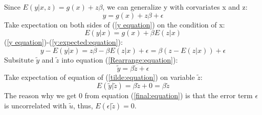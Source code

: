 \documentclass[11pt]{article} %
\begin{document}
Since $E(y|x,z)=g(x)+z\beta$, we can generalize y with corvariates x and z:
\begin{equation}
    y=g(x)+z\beta+\epsilon \label{y equation}
\end{equation}
Take expectation on both sides of (\ref{y equation}) on the condition of x:
\begin{equation} \label{y:expected:equation}
    E(y|x)=g(x)+\beta E(z|x) 
\end{equation}
(\ref{y equation})-(\ref{y:expected:equation}): 
\begin{equation}\label{Rearrange:equation}
    y-E(y|x)=z\beta-\beta E(z|x)+\epsilon=\beta(z-E(z|x))+\epsilon
\end{equation}
Subsitute $\tilde{y}$ and $\tilde{z}$ into equation (\ref{Rearrange:equation}):
\begin{equation}\label{tilde:equation}
    \tilde{y}=\beta \tilde{z}+\epsilon
\end{equation}
Take expectation of equation of (\ref{tilde:equation}) on variable $\tilde{z}$:
\begin{equation}\label{final:equation}
    E(\tilde{y}|\tilde{z})=\beta \tilde{z}+0=\beta\tilde{z}
\end{equation}
The reason why we get 0 from equation (\ref{final:equation}) is that the error term $\epsilon$ is uncorrelated with 
$\tilde{u}$, thus, $E(\epsilon|\tilde{z})=0$. 
\end{document}
